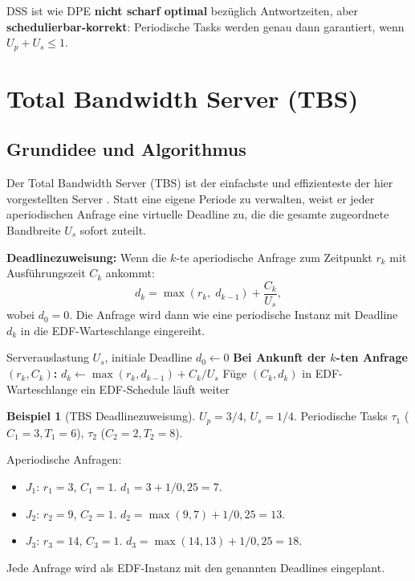 ﻿\documentclass[a4paper,12pt]{report}
\theoremstyle{definition}
\newtheorem{beispiel}{Beispiel}[chapter]
\begin{document}
DSS ist wie DPE \textbf{nicht scharf optimal} bezüglich Antwortzeiten, aber
\textbf{schedulierbar-korrekt}: Periodische Tasks werden genau dann garantiert, wenn
$U_p + U_s \leq 1$.

\section{Total Bandwidth Server (TBS)}

\subsection{Grundidee und Algorithmus}

Der Total Bandwidth Server (TBS) ist der einfachste und effizienteste der hier
vorgestellten Server \cite{Spuri1996}. Statt eine eigene Periode zu verwalten,
weist er jeder aperiodischen Anfrage eine virtuelle Deadline zu, die die gesamte
zugeordnete Bandbreite $U_s$ sofort zuteilt.

\textbf{Deadlinezuweisung:} Wenn die $k$-te aperiodische Anfrage zum Zeitpunkt
$r_k$ mit Ausführungszeit $C_k$ ankommt:
\[
	d_k = \max(r_k,\; d_{k-1}) + \frac{C_k}{U_s},
\]
wobei $d_0 = 0$. Die Anfrage wird dann wie eine periodische Instanz mit Deadline
$d_k$ in die EDF-Warteschlange eingereiht.

\begin{algorithm}[H]
	\caption{Total Bandwidth Server}
	\begin{algorithmic}[1]
		\Require Serverauslastung $U_s$, initiale Deadline $d_0 \leftarrow 0$
		\State
		\State \textbf{Bei Ankunft der $k$-ten Anfrage $(r_k, C_k)$:}
		\State $d_k \leftarrow \max(r_k, d_{k-1}) + C_k / U_s$
		\State Füge $(C_k, d_k)$ in EDF-Warteschlange ein
		\State EDF-Schedule läuft weiter
	\end{algorithmic}
\end{algorithm}

\begin{beispiel}[TBS Deadlinezuweisung]
	$U_p = 3/4$, $U_s = 1/4$. Periodische Tasks $\tau_1$ ($C_1=3, T_1=6$),
	$\tau_2$ ($C_2=2, T_2=8$).

	Aperiodische Anfragen:
	\begin{itemize}
		\item $J_1$: $r_1=3$, $C_1=1$. $d_1 = 3 + 1/0{,}25 = 7$.
		\item $J_2$: $r_2=9$, $C_2=1$. $d_2 = \max(9,7) + 1/0{,}25 = 13$.
		\item $J_3$: $r_3=14$, $C_3=1$. $d_3 = \max(14,13) + 1/0{,}25 = 18$.
	\end{itemize}
	Jede Anfrage wird als EDF-Instanz mit den genannten Deadlines eingeplant.
\end{beispiel}
\end{document}
